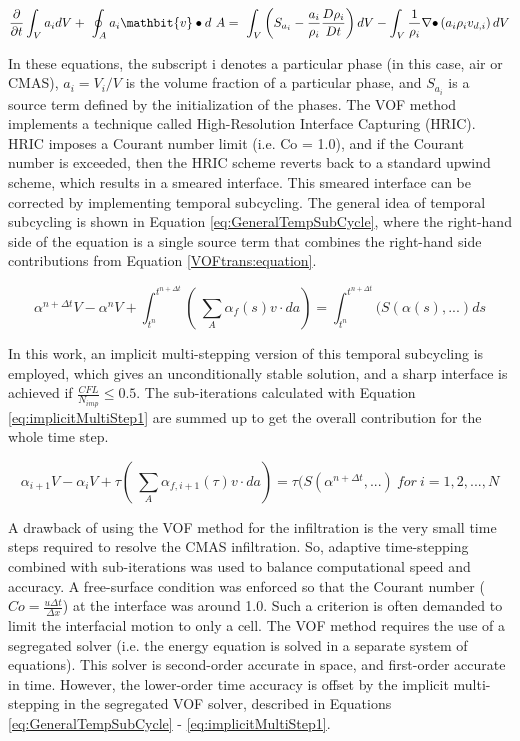 \documentclass[conf]{new-aiaa}
\begin{document}
\begin{equation}
\label{VOFtrans:equation}
    \frac{\partial}{\partial t}\int_{V}{a_idV}+\ \oint_{A}{a_i\mathbit{v}\bullet d\ A}=\ \int_{V}{\left(S_{a_i}-\frac{a_i}{\rho_i}\frac{D\rho_i}{Dt}\right)dV-\int_{V}{\frac{1}{\rho_i}\mathrm{\nabla}\bullet}}\left(a_i\rho_iv_{d,i}\right)dV
\end{equation}

\noindent In these equations, the subscript i denotes a particular phase (in this case, air or CMAS), $a_i = V_i/V$ is the volume fraction of a particular phase, and $S_a_i$ is a source term defined by the initialization of the phases. The VOF method implements a technique called High-Resolution Interface Capturing (HRIC). HRIC imposes a Courant number limit (i.e. Co = 1.0), and if the Courant number is exceeded, then the HRIC scheme reverts back to a standard upwind scheme, which results in a smeared interface. This smeared interface can be corrected by implementing temporal subcycling. The general idea of temporal subcycling is shown in Equation \ref{eq:GeneralTempSubCycle}, where the right-hand side of the equation is a single source term that combines the right-hand side contributions from Equation \ref{VOFtrans:equation}. 

\begin{equation}
\label{eq:GeneralTempSubCycle}
    \alpha^{n+\Delta t}V - \alpha^{n}V + \int_{t^{n}}^{t^{n+\Delta t}}( \ \sum_{A}\alpha_{f}(s) v \cdot da) = \int_{t^{n}}^{t^{n+\Delta t}}(S(\alpha (s),...)ds
\end{equation}

\noindent In this work, an implicit multi-stepping version of this temporal subcycling is employed, which gives an unconditionally stable solution, and a sharp interface is achieved if $\frac{CFL}{N_{imp}} \leqslant 0.5 $. The sub-iterations calculated with Equation \ref{eq:implicitMultiStep1} are summed up to get the overall contribution for the whole time step.

\begin{equation}
\label{eq:implicitMultiStep1}
    \alpha_{i+1}V - \alpha_{i}V + \tau( \ \sum_{A}\alpha_{f,i+1}(\tau) v \cdot da) = \tau(S(\alpha^{n+\Delta t},...) ~for~ i = 1, 2, ..., N
\end{equation}

A drawback of using the VOF method for the infiltration is the very small time steps required to resolve the CMAS infiltration. So, adaptive time-stepping combined with sub-iterations was used to balance computational speed and accuracy. A free-surface condition was enforced so that the Courant number ($Co = \frac{u \Delta t}{\Delta x}$) at the interface was around 1.0. Such a criterion is often demanded to limit the interfacial motion to only a cell. The VOF method requires the use of a segregated solver (i.e. the energy equation is solved in a separate system of equations). This solver is second-order accurate in space, and first-order accurate in time. However, the lower-order time accuracy is offset by the implicit multi-stepping in the segregated VOF solver, described in Equations \ref{eq:GeneralTempSubCycle} - \ref{eq:implicitMultiStep1}. 
\end{document}
